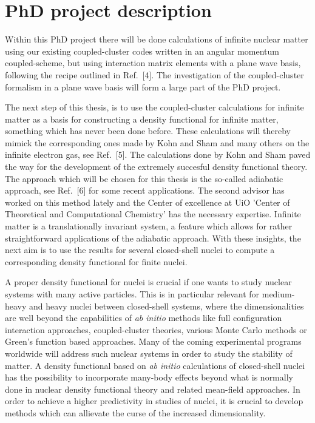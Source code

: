 \documentclass[12pt,titlepage]{article}
\begin{document}
\section{PhD project description}
Within this PhD project there will be done calculations of infinite nuclear matter using our existing coupled-cluster codes written in an angular momentum coupled-scheme, but using interaction matrix elements 
with a plane wave basis, following the recipe outlined in Ref.~[4]. The investigation of the coupled-cluster formalism in a plane wave basis will form a large part of the PhD project. 

The next step of this thesis, is to use the coupled-cluster calculations
for infinite matter as a basis for constructing a density functional for 
infinite matter, something which has never been done before. These calculations
will thereby mimick the corresponding ones made by Kohn and Sham and many others 
on the infinite electron gas, see Ref.~[5]. The calculations done by Kohn and Sham paved the way for the development of the extremely succesful density functional theory. 
The approach which will be chosen for this thesis is the so-called adiabatic
approach, see Ref.~[6] for some recent applications.  The second advisor has worked on this method lately
and the Center of excellence at UiO 'Center of Theoretical and Computational Chemistry' has the necessary
expertise.  
Infinite matter is a translationally invariant system, a feature which allows for rather straightforward applications of the adiabatic approach. 
With these insights, the next aim is to use the results for several 
closed-shell nuclei to compute a corresponding density functional for 
finite nuclei. 

A proper density functional  for nuclei is crucial if one wants to study nuclear systems with many active particles. This is in particular relevant for medium-heavy and heavy nuclei between closed-shell systems, 
where the dimensionalities are well 
beyond the capabilities of {\em ab initio} methods like full configuration interaction approaches, coupled-cluster theories, various Monte Carlo methods or Green's function based approaches. Many of the coming experimental programs worldwide will address such nuclear systems in order to study the stability of matter. 
A density functional based on {\em ab initio} calculations of closed-shell nuclei has the possibility 
to incorporate many-body effects beyond what is normally done in nuclear density functional theory and related
mean-field approaches.  In order to achieve a higher predictivity in studies of nuclei, it is crucial to develop methods which can allievate the curse of the increased dimensionality.
\end{document}
